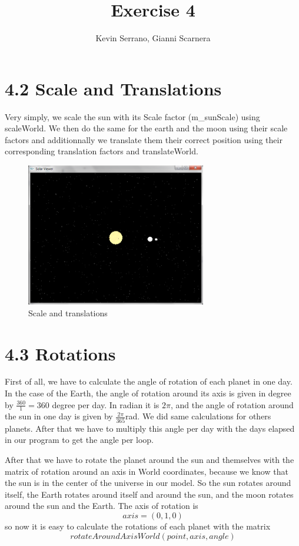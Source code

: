 \documentclass[10pt,a4paper]{report}
\author{Kevin Serrano, Gianni Scarnera}
\title{Exercise 4}
\begin{document}
\maketitle

\section*{4.2   Scale and Translations}
Very simply, we scale the sun with its Scale factor (m\_sunScale) using scaleWorld. We then do the same for the earth and the moon using their scale factors and additionnally we translate them their correct position using their corresponding translation factors and translateWorld.
\begin{figure}[h!]
\caption{Scale and translations}
  \centering
    \includegraphics[width=0.7\textwidth]{im_4_2.png}
\end{figure}

\section*{4.3   Rotations}
First of all, we have to calculate the angle of rotation of each planet in one day. In the case of the Earth, the angle of rotation around its axis is given in degree by $\frac{360}{1} = 360$ degree per day. In radian it is $2 \pi$, and the angle of rotation around the sun in one day is given by $\frac{2 \pi}{365} $rad. We did same calculations for others planets. After that we have to multiply this angle per day with the days elapsed in our program to get the angle per loop.

After that we have to rotate the planet around the sun and themselves with the matrix of rotation around an axis in World coordinates, because we know that the sun is in the center of the universe in our model. So the sun rotates around itself, the Earth rotates around itself and around the sun, and the moon rotates around the sun and the Earth. The axis of rotation is $$axis = (0,1,0)$$ so now it is easy to calculate the rotations of each planet with the matrix $$rotateAroundAxisWorld(point,axis,angle)$$
\end{document}
